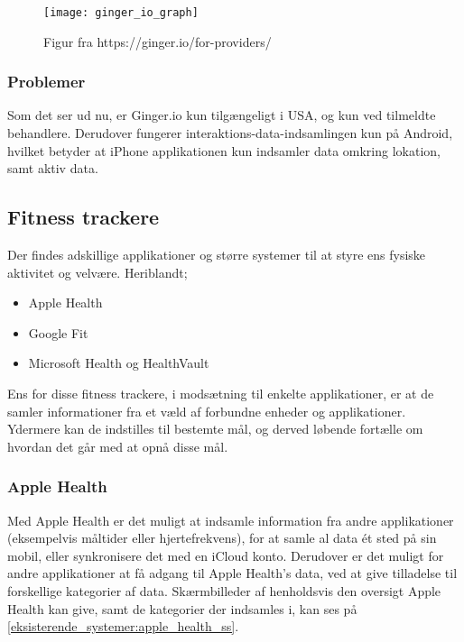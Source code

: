 \begin{figure}[h]
\centering
\texttt{[image: ginger\_io\_graph]}
\caption{Figur fra https://ginger.io/for-providers/}
\label{eksisterende_systemer:ginger_io_graf}
\end{figure}

\subsubsection{Problemer}
Som det ser ud nu, er Ginger.io kun tilgængeligt i USA, og kun ved tilmeldte behandlere.
Derudover fungerer interaktions-data-indsamlingen kun på Android, hvilket betyder at iPhone applikationen kun indsamler data omkring lokation, samt aktiv data.

\subsection{Fitness trackere}
Der findes adskillige applikationer og større systemer til at styre ens fysiske aktivitet og velvære.
Heriblandt;
\begin{itemize}
\item Apple Health\citep{apple_health}
\item Google Fit\citep{google_fit,google_fit_api}
\item Microsoft Health\citep{ms_health} og HealthVault\citep{ms_health_vault,ms_health_vault_api}
\end{itemize}

Ens for disse fitness trackere, i modsætning til enkelte applikationer, er at de samler informationer fra et væld af forbundne enheder og applikationer.
Ydermere kan de indstilles til bestemte mål, og derved løbende fortælle om hvordan det går med at opnå disse mål.

\subsubsection{Apple Health}
Med Apple Health er det muligt at indsamle information fra andre applikationer (eksempelvis måltider eller hjertefrekvens), for at samle al data ét sted på sin mobil, eller synkronisere det med en iCloud konto.
Derudover er det muligt for andre applikationer at få adgang til Apple Health's data, ved at give tilladelse til forskellige kategorier af data.
Skærmbilleder af henholdsvis den oversigt Apple Health kan give, samt de kategorier der indsamles i, kan ses på \cref{eksisterende_systemer:apple_health_ss}.

